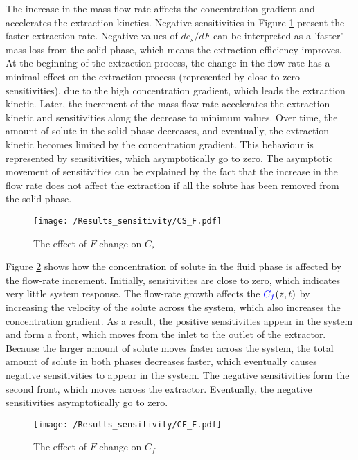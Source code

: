 \documentclass[../Article_Model_Parameters.tex]{subfiles}
\begin{document}
    The increase in the mass flow rate affects the concentration gradient and accelerates the extraction kinetics. Negative sensitivities in Figure \ref{fig:Sensitivty_F_CS} present the faster extraction rate. Negative values of $dc_s/dF$ can be interpreted as a 'faster' mass loss from the solid phase, which means the extraction efficiency improves. At the beginning of the extraction process, the change in the flow rate has a minimal effect on the extraction process (represented by close to zero sensitivities), due to the high concentration gradient, which leads the extraction kinetic. Later, the increment of the mass flow rate accelerates the extraction kinetic and sensitivities along the decrease to minimum values. Over time, the amount of solute in the solid phase decreases, and eventually, the extraction kinetic becomes limited by the concentration gradient. This behaviour is represented by sensitivities, which asymptotically go to zero. The asymptotic movement of sensitivities can be explained by the fact that the increase in the flow rate does not affect the extraction if all the solute has been removed from the solid phase.
    
    \begin{figure}[h!]
    	\centering
    	\texttt{[image: /Results\_sensitivity/CS\_F.pdf]}
    	\caption{The effect of $F$ change on $C_s$}
    	\label{fig:Sensitivty_F_CS}
    \end{figure}
    
    Figure \ref{fig:Sensitivty_F_CF} shows how the concentration of solute in the fluid phase is affected by the flow-rate increment. Initially, sensitivities are close to zero, which indicates very little system response. The flow-rate growth affects the ${\color{blue}C_f}(z,t)$ by increasing the velocity of the solute across the system, which also increases the concentration gradient. As a result, the positive sensitivities appear in the system and form a front, which moves from the inlet to the outlet of the extractor. Because the larger amount of solute moves faster across the system, the total amount of solute in both phases decreases faster, which eventually causes negative sensitivities to appear in the system. The negative sensitivities form the second front, which moves across the extractor. Eventually, the negative sensitivities asymptotically go to zero.
    
    \begin{figure}[h!]
    	\centering
    	\texttt{[image: /Results\_sensitivity/CF\_F.pdf]}
    	\caption{The effect of $F$ change on $C_f$}
    	\label{fig:Sensitivty_F_CF}
    \end{figure}
    
\end{document}
